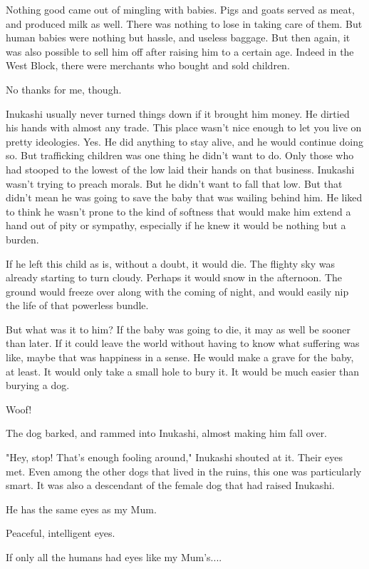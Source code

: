 Nothing good came out of mingling with babies. Pigs and goats served as
meat, and produced milk as well. There was nothing to lose in taking
care of them. But human babies were nothing but hassle, and useless
baggage. But then again, it was also possible to sell him off after
raising him to a certain age. Indeed in the West Block, there were
merchants who bought and sold children.

No thanks for me, though.

Inukashi usually never turned things down if it brought him money. He
dirtied his hands with almost any trade. This place wasn't nice enough
to let you live on pretty ideologies. Yes. He did anything to stay
alive, and he would continue doing so. But trafficking children was one
thing he didn't want to do. Only those who had stooped to the lowest of
the low laid their hands on that business. Inukashi wasn't trying to
preach morals. But he didn't want to fall that low. But that didn't mean
he was going to save the baby that was wailing behind him. He liked to
think he wasn't prone to the kind of softness that would make him extend
a hand out of pity or sympathy, especially if he knew it would be
nothing but a burden.

If he left this child as is, without a doubt, it would die. The flighty
sky was already starting to turn cloudy. Perhaps it would snow in the
afternoon. The ground would freeze over along with the coming of night,
and would easily nip the life of that powerless bundle.

But what was it to him? If the baby was going to die, it may as well be
sooner than later. If it could leave the world without having to know
what suffering was like, maybe that was happiness in a sense. He would
make a grave for the baby, at least. It would only take a small hole to
bury it. It would be much easier than burying a dog.

Woof!

The dog barked, and rammed into Inukashi, almost making him fall over.

"Hey, stop! That's enough fooling around," Inukashi shouted at it. Their
eyes met. Even among the other dogs that lived in the ruins, this one
was particularly smart. It was also a descendant of the female dog that
had raised Inukashi.

He has the same eyes as my Mum.

Peaceful, intelligent eyes.

If only all the humans had eyes like my Mum's....

